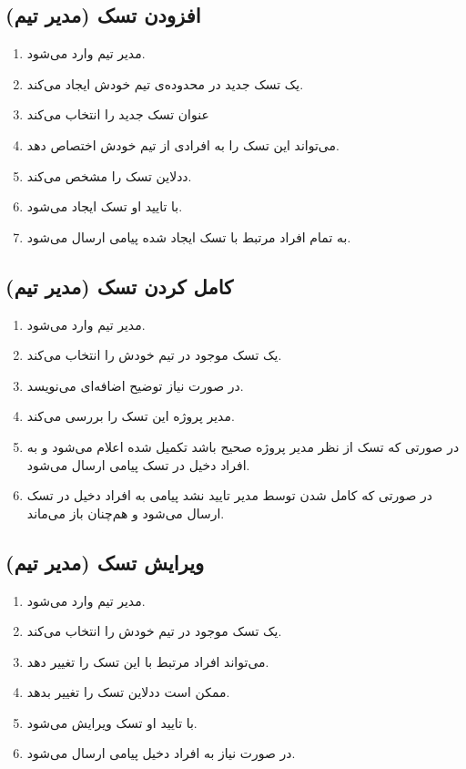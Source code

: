 \documentclass[10pt,a4paper]{article}
\begin{document}
\subsection{
	افزودن تسک (مدیر تیم)
}
\begin{enumerate}
	\item 
	مدیر تیم وارد می‌شود.
	\item
	یک تسک جدید در محدوده‌ی تیم خودش ایجاد می‌کند.
	\item
	عنوان تسک جدید را انتخاب می‌کند
	\item
	می‌تواند این تسک را به افرادی از تیم خودش اختصاص دهد.
	\item
	ددلاین تسک را مشخص می‌کند.
	\item
	با تایید او تسک ایجاد می‌شود.
	\item
	به تمام افراد مرتبط با تسک ایجاد شده پیامی ارسال می‌شود.
\end{enumerate}
\subsection{
	کامل کردن تسک (مدیر تیم)
}

\begin{enumerate}
	\item 
	مدیر تیم وارد می‌شود.
	\item
	یک تسک موجود در تیم خودش را انتخاب می‌کند.
	\item
	در صورت نیاز توضیح اضافه‌ای می‌نویسد.
	\item
	مدیر پروژه این تسک را بررسی می‌کند.
	\item
	در صورتی که تسک از نظر مدیر پروژه صحیح باشد تکمیل شده اعلام می‌شود و به افراد دخیل در تسک پیامی ارسال می‌شود.
	\item
	در صورتی که کامل شدن توسط مدیر تایید نشد پیامی به افراد دخیل در تسک ارسال می‌شود و هم‌چنان باز می‌ماند.
	
\end{enumerate}


\subsection{
	ویرایش تسک (مدیر تیم)
}

\begin{enumerate}
	\item 
	مدیر تیم وارد می‌شود.
	\item
	یک تسک موجود در تیم خودش را انتخاب می‌کند.
	\item
	می‌تواند افراد مرتبط با این تسک را تغییر دهد.
	\item
	ممکن است ددلاین تسک را تغییر بدهد.
	\item
	با تایید او تسک ویرایش می‌شود.
	\item
	در صورت نیاز به افراد دخیل پیامی ارسال می‌شود.
\end{enumerate}
\end{document}
